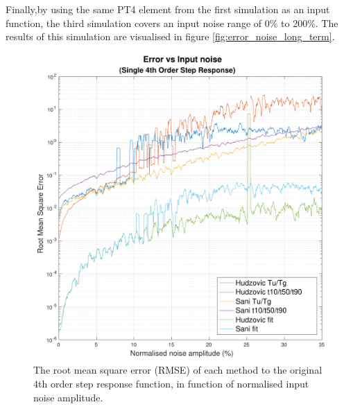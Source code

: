 Finally,by using the same  PT4  element  from  the  first simulation as an input
function, the third simulation  covers an input noise range of 0\% to 200\%. The
results     of     this     simulation     are     visualised      in     figure
\ref{fig:error_noise_long_term}.

\begin{figure}
    \includegraphics[width=\linewidth]{images/error_noise_4th_order_steps}
    \caption{The root mean square error (RMSE) of each method to the original 4th order step response function, in function of normalised input noise amplitude.}
    \label{fig:error_noise_4th}
\end{figure}
